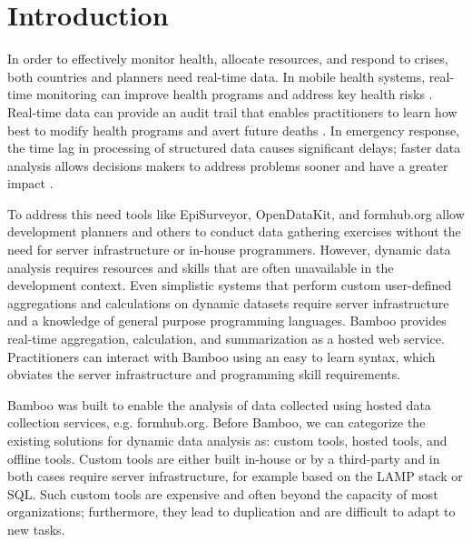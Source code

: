 \documentclass{acm_proc_article-sp}
\begin{document}



\section{Introduction}
In order to effectively monitor health, allocate resources, and respond to crises, both countries and planners need real-time data.  In mobile health systems, real-time monitoring can improve health programs and address key health risks \cite{mechael}.  Real-time data can provide an audit trail that enables practitioners to learn how best to modify health programs and avert future deaths \cite{krisberg}.  In emergency response, the time lag in processing of structured data causes significant delays; faster data analysis allows decisions makers to address problems sooner and have a greater impact \cite{internews}.

To address this need tools like EpiSurveyor, OpenDataKit, and formhub.org allow development planners and others to conduct data gathering exercises without the need for server infrastructure or in-house programmers.  However, dynamic data analysis requires resources and skills that are often unavailable in the development context.  Even simplistic systems that perform custom user-defined aggregations and calculations on dynamic datasets require server infrastructure and a knowledge of general purpose programming languages.  Bamboo provides real-time aggregation, calculation, and summarization as a hosted web service.  Practitioners can interact with Bamboo using an easy to learn syntax, which obviates the server infrastructure and programming skill requirements.  

Bamboo was built to enable the analysis of data collected using hosted data collection services, e.g. formhub.org.  Before Bamboo, we can categorize the existing solutions for dynamic data analysis as: custom tools, hosted tools, and offline tools.  Custom tools are either built in-house or by a third-party and in both cases require server infrastructure, for example based on the LAMP stack or SQL.  Such custom tools are expensive and often beyond the capacity of most organizations; furthermore, they lead to duplication and are difficult to adapt to new tasks.
\end{document}
